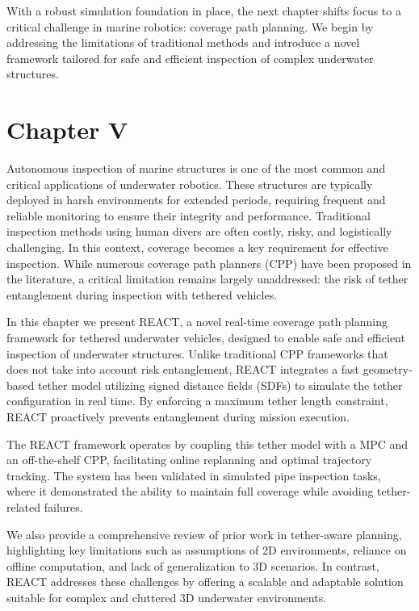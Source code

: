 With a robust simulation foundation in place, the next chapter shifts focus to a critical challenge in marine robotics: coverage path planning. We begin by addressing the limitations of traditional methods and introduce a novel framework tailored for safe and efficient inspection of complex underwater structures.


\section{Chapter V}
\label{ch:react}

Autonomous inspection of marine structures is one of the most common and critical applications of underwater robotics. These structures are typically deployed in harsh environments for extended periods, requiring frequent and reliable monitoring to ensure their integrity and performance. Traditional inspection methods using human divers are often costly, risky, and logistically challenging. In this context, coverage becomes a key requirement for effective inspection. While numerous coverage path planners (CPP) have been proposed in the literature, a critical limitation remains largely unaddressed: the risk of tether entanglement during inspection with tethered vehicles.
 
 In this chapter we present REACT, a novel real-time coverage path planning framework for tethered underwater vehicles, designed to enable safe and efficient inspection of underwater structures. Unlike traditional CPP frameworks that does not take into account risk entanglement, REACT integrates a fast geometry-based tether model utilizing signed distance fields (SDFs) to simulate the tether configuration in real time. By enforcing a maximum tether length constraint, REACT proactively prevents entanglement during mission execution.

The REACT framework operates by coupling this tether model with a MPC and an off-the-shelf CPP, facilitating online replanning and optimal trajectory tracking. The system has been validated in simulated pipe inspection tasks, where it demonstrated the ability to maintain full coverage while avoiding tether-related failures.

We also provide a comprehensive review of prior work in tether-aware planning, highlighting key limitations such as assumptions of 2D environments, reliance on offline computation, and lack of generalization to 3D scenarios. In contrast, REACT addresses these challenges by offering a scalable and adaptable solution suitable for complex and cluttered 3D underwater environments.

